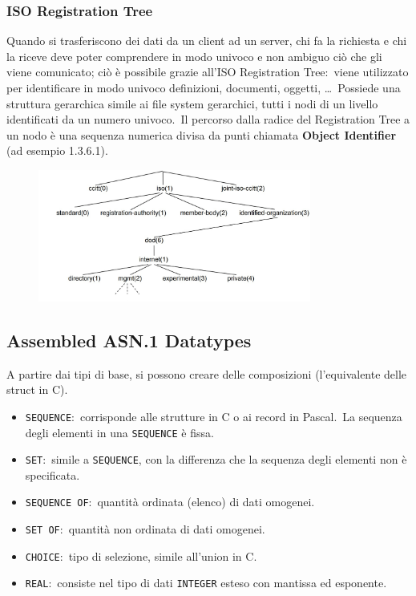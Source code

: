\subsubsection{ISO Registration Tree}

Quando si trasferiscono dei dati da un client ad un server, chi fa la richiesta e chi la riceve deve poter comprendere in modo univoco e non ambiguo ciò che gli viene comunicato; ciò è possibile grazie all'ISO Registration Tree:\ viene utilizzato per identificare in modo univoco definizioni, documenti, oggetti, \dots\
Possiede una struttura gerarchica simile ai file system gerarchici, tutti i nodi di un livello identificati da un numero univoco.\
Il percorso dalla radice del Registration Tree a un nodo è una sequenza numerica divisa da punti chiamata \textbf{Object Identifier} (ad esempio 1.3.6.1).

\begin{figure}[H]
    \centering
    \includegraphics[width=0.8\textwidth]{immagini/ISO_regTree.jpg}
\end{figure}

\subsection{Assembled ASN.1 Datatypes}

A partire dai tipi di base, si possono creare delle composizioni (l'equivalente delle struct in C).\

\begin{itemize}
    \item \texttt{SEQUENCE}:\ corrisponde alle strutture in C o ai record in Pascal.\ La sequenza degli elementi in una \texttt{SEQUENCE} è fissa.
    \item \texttt{SET}:\ simile a \texttt{SEQUENCE}, con la differenza che la sequenza degli elementi non è specificata.
    \item \texttt{SEQUENCE OF}:\ quantità ordinata (elenco) di dati omogenei.
    \item \texttt{SET OF}:\ quantità non ordinata di dati omogenei.
    \item \texttt{CHOICE}:\ tipo di selezione, simile all'union in C.
    \item \texttt{REAL}:\ consiste nel tipo di dati \texttt{INTEGER} esteso con mantissa ed esponente.
\end{itemize}

